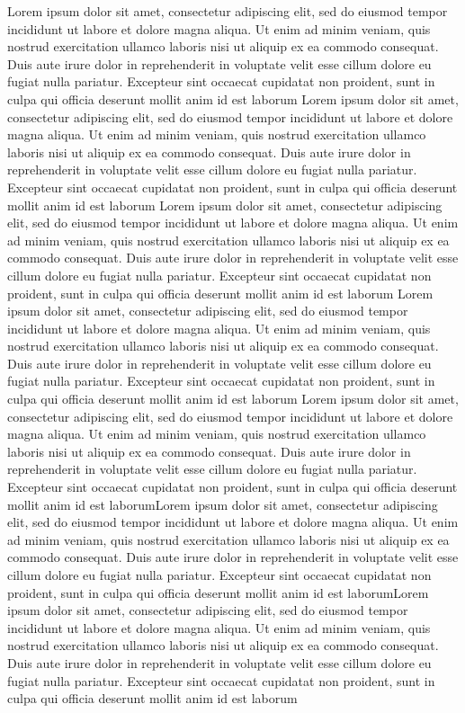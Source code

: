 \documentclass[reprint,superscriptaddress,floatfix]{revtex4-2}
\begin{document}
Lorem ipsum dolor sit amet, consectetur adipiscing elit, sed do eiusmod tempor incididunt ut labore et dolore magna aliqua. Ut enim ad minim veniam, quis nostrud exercitation ullamco laboris nisi ut aliquip ex ea commodo consequat. Duis aute irure dolor in reprehenderit in voluptate velit esse cillum dolore eu fugiat nulla pariatur. Excepteur sint occaecat cupidatat non proident, sunt in culpa qui officia deserunt mollit anim id est laborum
Lorem ipsum dolor sit amet, consectetur adipiscing elit, sed do eiusmod tempor incididunt ut labore et dolore magna aliqua. Ut enim ad minim veniam, quis nostrud exercitation ullamco laboris nisi ut aliquip ex ea commodo consequat. Duis aute irure dolor in reprehenderit in voluptate velit esse cillum dolore eu fugiat nulla pariatur. Excepteur sint occaecat cupidatat non proident, sunt in culpa qui officia deserunt mollit anim id est laborum
Lorem ipsum dolor sit amet, consectetur adipiscing elit, sed do eiusmod tempor incididunt ut labore et dolore magna aliqua. Ut enim ad minim veniam, quis nostrud exercitation ullamco laboris nisi ut aliquip ex ea commodo consequat. Duis aute irure dolor in reprehenderit in voluptate velit esse cillum dolore eu fugiat nulla pariatur. Excepteur sint occaecat cupidatat non proident, sunt in culpa qui officia deserunt mollit anim id est laborum
Lorem ipsum dolor sit amet, consectetur adipiscing elit, sed do eiusmod tempor incididunt ut labore et dolore magna aliqua. Ut enim ad minim veniam, quis nostrud exercitation ullamco laboris nisi ut aliquip ex ea commodo consequat. Duis aute irure dolor in reprehenderit in voluptate velit esse cillum dolore eu fugiat nulla pariatur. Excepteur sint occaecat cupidatat non proident, sunt in culpa qui officia deserunt mollit anim id est laborum
Lorem ipsum dolor sit amet, consectetur adipiscing elit, sed do eiusmod tempor incididunt ut labore et dolore magna aliqua. Ut enim ad minim veniam, quis nostrud exercitation ullamco laboris nisi ut aliquip ex ea commodo consequat. Duis aute irure dolor in reprehenderit in voluptate velit esse cillum dolore eu fugiat nulla pariatur. Excepteur sint occaecat cupidatat non proident, sunt in culpa qui officia deserunt mollit anim id est laborumLorem ipsum dolor sit amet, consectetur adipiscing elit, sed do eiusmod tempor incididunt ut labore et dolore magna aliqua. Ut enim ad minim veniam, quis nostrud exercitation ullamco laboris nisi ut aliquip ex ea commodo consequat. Duis aute irure dolor in reprehenderit in voluptate velit esse cillum dolore eu fugiat nulla pariatur. Excepteur sint occaecat cupidatat non proident, sunt in culpa qui officia deserunt mollit anim id est laborumLorem ipsum dolor sit amet, consectetur adipiscing elit, sed do eiusmod tempor incididunt ut labore et dolore magna aliqua. Ut enim ad minim veniam, quis nostrud exercitation ullamco laboris nisi ut aliquip ex ea commodo consequat. Duis aute irure dolor in reprehenderit in voluptate velit esse cillum dolore eu fugiat nulla pariatur. Excepteur sint occaecat cupidatat non proident, sunt in culpa qui officia deserunt mollit anim id est laborum
\end{document}
